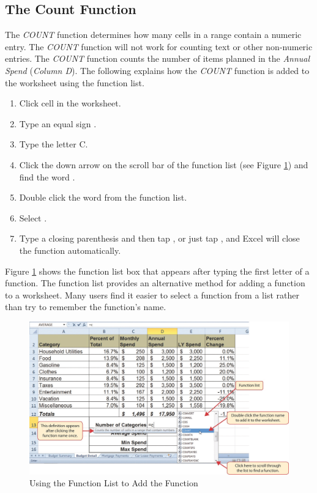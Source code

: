 \subsection{The Count Function}

The \textit{COUNT} function determines how many cells in a range contain a numeric entry. The \textit{COUNT} function will not work for counting text or other non-numeric entries. The \textit{COUNT} function counts the number of items planned in the \textit{Annual Spend} (\textit{Column D}). The following explains how the \textit{COUNT} function is added to the worksheet using the function list.

\begin{enumbox}
	\begin{enumerate}
		\item Click cell  in the  worksheet.
		\item Type an equal sign \fmtTyping{=}.
		\item Type the letter C.
		\item Click the down arrow on the scroll bar of the function list (see Figure \ref{02:fig17}) and find the word .
		\item Double click the word  from the function list.
		\item Select .
		\item Type a closing parenthesis \fmtTyping{)} and then tap , or just tap , and Excel will close the function automatically.
	\end{enumerate}
\end{enumbox}

Figure \ref{02:fig17} shows the function list box that appears after typing the first letter of a function. The function list provides an alternative method for adding a function to a worksheet. Many users find it easier to select a function from a list rather than try to remember the function's name.

\begin{figure}[H]
	\centering
	\includegraphics[width=\maxwidth{.95\linewidth}]{gfx/ch02_fig17}
	\caption{Using the Function List to Add the  Function}
	\label{02:fig17}
\end{figure}

